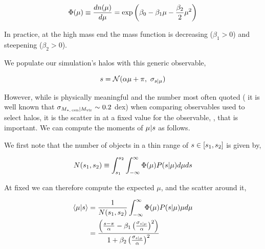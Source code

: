 \documentclass[a4paper,fleqn,usenatbib]{mnras}
\begin{document}
\begin{equation}
    \Phi(\mu){} \equiv \frac{dn(\mu)}{d\mu{}}  = \exp \left(\beta_0 - \beta_1 \mu - \frac{\beta_2}{2} \mu^2 \right)
    \label{eq:quadratic_hmf}
\end{equation}

\noindent In practice, at the high mass end the mass function is decreasing ($\beta_1 > 0$) and steepening ($\beta_2 > 0$).

We populate our simulation's halos with this generic observable,

\begin{equation}
    s = \mathcal{N}(\alpha \mu + \pi,\ \sigma_{s{} | \mu{}})
    \label{eq:lognormal_obs_given_mhalo}
\end{equation}

However, while \scatterObsSymMhalo{} is physically meaningful and the number most often quoted (\eg{}  it is well known that $\sigma_{M_{\ast,\,\rm cen} | M_{\rm vir}{}} \sim 0.2$ dex) when comparing observables used to select halos, it is the scatter in \Mhalo{} at a fixed value for the observable, \scatterMhaloObsSym{}, that is important. We can compute the moments of $\mu | s$ as follows.

We first note that the number of objects in a thin range of $s \in [s_1, s_2]$ is given by,

\begin{equation}
    N(s{}_1, s{}_2) \equiv \int_{s{}_1}^{s{}_2} \int_{-\infty}^{\infty} \Phi(\mu){} P(s{} | \mu) d\mu ds{}
\end{equation}


At fixed \obsSym{} we can therefore compute the expected $\mu$, and the scatter around it,

\begin{equation}
\begin{aligned}
    \langle \mu | s \rangle 
    &= \frac{1}{N(s_1, s_2)}
        \int_{-\infty}^{\infty} \Phi(\mu){} P(s{} | \mu) \mu d\mu \\
    &= \frac{\left( \frac{s- \pi}{\alpha} - \beta_1 \left(\frac{\sigma_{s{} | \mu{}}}{\alpha}\right)^2 \right)}{ 1 + \beta_2 \left(\frac{\sigma_{s{} | \mu{}}}{\alpha}\right)^2}
    \label{eq:mean_of_mu}
\end{aligned}
\end{equation}
\end{document}
